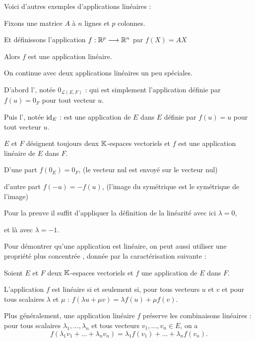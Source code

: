 \diapo

Voici d'autres exemples d'applications linéaires :


Fixons une matrice $A$ à $n$ lignes et $p$ colonnes.

Et définissons l'application $f : \mathbb{R}^p \longrightarrow \mathbb{R}^n$ par 
$f(X) = AX$

Alors $f$ est une application linéaire.

\change

On continue avec deux applications linéaires un peu spéciales.

D'abord l', notée $0_{\mathcal{L}(E,F)}$ : 
qui est simplement l'application définie par $f(u) = 0_F$ pour tout vecteur $u$.
 
\change

Puis l', notée $\mathop{\text{id}}\nolimits_E$ :
est une application de $E$ dans $E$ définie par
$f(u) = u$ pour tout vecteur $u$.



\diapo


$E$ et $F$ désignent toujours deux $\mathbb{K}$-espaces vectoriels et $f$ est une 
application linéaire de $E$ dans $F$.

D'une part $f(0_{E})=0_{F}$, (le vecteur nul est envoyé sur le vecteur nul)

d'autre part $f(-u)=-f(u)$, (l'image du symétrique est le symétrique de l'image)


Pour la preuve il suffit d'appliquer la définition de la linéarité avec ici $\lambda =0$, 

et là avec $\lambda =-1$.


\diapo

Pour démontrer qu'une application est linéaire, 
on peut aussi utiliser une propriété plus \og concentrée \fg,  
donnée par la caractérisation suivante :


Soient $E$ et $F$ deux $\mathbb{K}$-espaces vectoriels et 
$f$ une application de $E$ dans $F$.


L'application $f$ est linéaire si et seulement si, 
pour tous vecteurs $u$ et $v$ et pour tous scalaires  
$\lambda$ et $\mu$ :
$f(\lambda u + \mu v)=\lambda f(u)+\mu f(v)$.

\change

Plus généralement, une application linéaire $f$ préserve les combinaisons linéaires :
pour tous scalaires $\lambda_1, \dots , \lambda_n$ et tous vecteurs $v_1, \dots , v_n \in E$, on a 
$$f(\lambda_1 v_1 +\dots + \lambda_n v_n) = \lambda_1 f(v_1) + \dots + \lambda_n
f(v_n).$$



